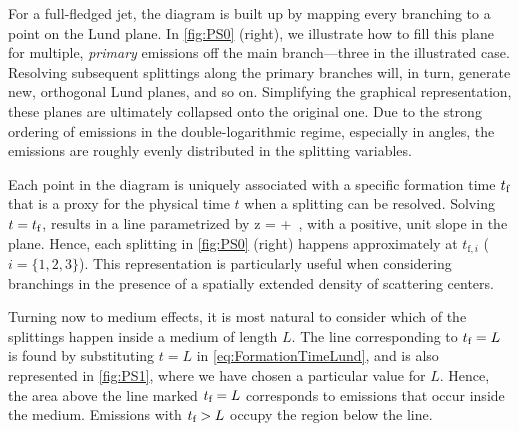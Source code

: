 For a full-fledged jet, the diagram is built up by mapping every branching to a point on the Lund plane. In \autoref{fig:PS0} (right), we illustrate how to fill this plane for multiple, {\sl primary} emissions off the main branch---three in the illustrated case. Resolving subsequent splittings along the primary branches will, in turn, generate new, orthogonal Lund planes, and so on. Simplifying the graphical representation, these planes are ultimately collapsed onto the original one. Due to the strong ordering of emissions in the double-logarithmic regime, especially in angles, the emissions are roughly evenly distributed in the splitting variables.

Each point in the diagram is uniquely associated with a specific formation time $t_\text{f}$ that is a proxy for the physical time $t$ when a splitting can be resolved.
Solving $t = t_\text{f}$, results in a line parametrized by
\beq
\label{eq:FormationTimeLund}
\log z \theta = \log {} + \log {} \,,
\eeq
with a positive, unit slope in the plane.
Hence, each splitting in \autoref{fig:PS0} (right) happens approximately at $t_{\text{f},i}$ ($i=\{1,2,3\}$). This representation is particularly useful when considering branchings in the presence of a spatially extended density of scattering centers.

Turning now to medium effects, it is most natural to consider which of the splittings happen inside a medium of length $L$.  The line corresponding to $t_\text{f} = L$ is found by substituting $t = L$ in \eqref{eq:FormationTimeLund}, and is also represented in \autoref{fig:PS1}, where we have chosen a particular value for $L$. Hence, the area above the line marked $t_\text{f} = L$ corresponds to emissions that occur inside the medium. Emissions with $t_\text{f} > L$ occupy the region below the line.

